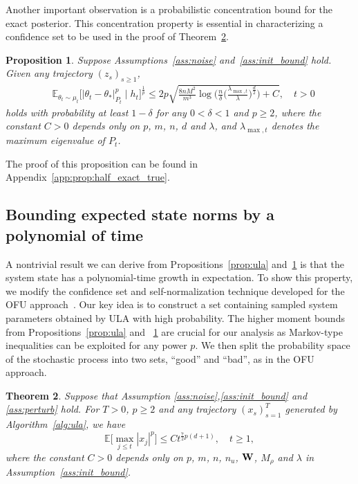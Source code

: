 \documentclass[11pt]{article}
\theoremstyle{plain}
\newtheorem{thm}{Theorem}[section]
\newtheorem{prop}[thm]{Proposition}
\theoremstyle{definition}
\theoremstyle{remark}
\begin{document}
Another important observation is a probabilistic concentration bound for the exact posterior. 
This concentration property is essential in characterizing a confidence set to be used in the proof of Theorem~\ref{thm:state_poly}.
\begin{prop}\label{prop:half_exact_true}
Suppose Assumptions~\ref{ass:noise} and~\ref{ass:init_bound} hold. 
Given any trajectory $(z_s)_{s\geq1}$,
\begin{equation}
\begin{split}
    &\mathbb{E}_{\theta_t \sim \mu_t}\big[
    | \theta_t - \theta_* |^p_{P_t} \mid h_{t}
    \big ]^{\frac{1}{p}} \leq 2p \sqrt{\frac{8nM^2}{m^3}\log \bigg(\frac{n}{\delta}\bigg(\frac{\lambda_{\max,t}}{\lambda}\bigg)^{\frac{d}{2}}\bigg)+C}, \quad t >0
\end{split}
\end{equation}
holds with probability at least $1-\delta$ for
any $0<\delta < 1$ and $p \geq 2$, where
the constant $C>0$ depends only on $p$, $m$, $n$, $d$ and $\lambda$, and $\lambda_{\max,t}$ denotes the maximum eigenvalue of $P_t$.
\end{prop}

The proof of this proposition can be found in Appendix~\ref{app:prop:half_exact_true}.


\subsection{Bounding expected state norms by a polynomial of time}\label{sec:polystate}

A nontrivial result we can derive from Propositions~\ref{prop:ula} and~\ref{prop:half_exact_true} is that the system state has a polynomial-time growth in expectation. 
To show this property, we modify the confidence set and self-normalization technique developed for the OFU approach~\cite{abbasi2011improved,abbasi2011regret}.
Our key idea is to construct a set containing sampled system parameters obtained by ULA with high probability.
The higher moment bounds from Propositions~\ref{prop:ula} and ~\ref{prop:half_exact_true} are crucial for our analysis as Markov-type inequalities can be exploited for any power $p$. We then split the probability space of the stochastic process into two sets, ``good'' and ``bad'', as in the OFU approach.

\begin{thm}\label{thm:state_poly}
Suppose that Assumption \ref{ass:noise},\ref{ass:init_bound} and \ref{ass:perturb} hold.
For $T >0$, $p\geq 2$ and any trajectory $(x_s)_{s=1}^T$ generated by Algorithm~\ref{alg:ula}, we have
\[
\mathbb{E} \Big [\max_{j\leq t}|x_j|^p  \Big ] \leq Ct^{\frac{7}{2}p(d+1)}, \quad t \geq 1,
\]
where the constant $C>0$ depends only on $p$, $m$, $n$, $n_u$, $\bold{W}$, $M_\rho$ and $\lambda$ in Assumption~\ref{ass:init_bound}. 
\end{thm}
\end{document}
